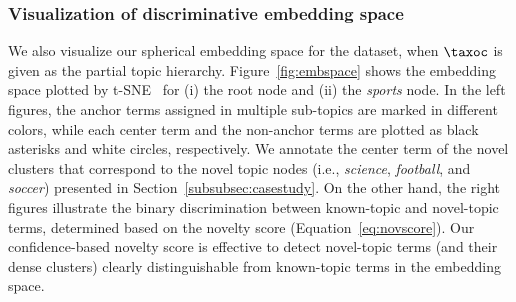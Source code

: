 \subsubsection{Visualization of discriminative embedding space}
\label{subsubsec:embvis}
We also visualize our spherical embedding space for the \nyt dataset, when $\taxoc$ is given as the partial topic hierarchy.
Figure~\ref{fig:embspace} shows the embedding space plotted by t-SNE~\cite{van2008visualizing} for (i) the root node and (ii) the \textit{sports} node.
In the left figures, the anchor terms assigned in multiple sub-topics are marked in different colors, while each center term and the non-anchor terms are plotted as black asterisks and white circles, respectively.
We annotate the center term of the novel clusters that correspond to the novel topic nodes (i.e., \textit{science}, \textit{football}, and \textit{soccer}) presented in Section~\ref{subsubsec:casestudy}.
On the other hand, the right figures illustrate the binary discrimination between known-topic and novel-topic terms, determined based on the novelty score (Equation~\eqref{eq:novscore}).
Our confidence-based novelty score is effective to detect novel-topic terms (and their dense clusters) clearly distinguishable from known-topic terms in the embedding space.
